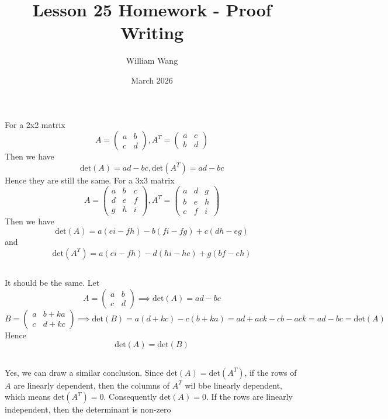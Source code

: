 \documentclass{article}
\title{Lesson 25 Homework - Proof Writing}
\author{William Wang}
\date{March 2026}
\begin{document}
\maketitle

\section{}
\subsection{}
For a 2x2 matrix
\[A = \begin{pmatrix}
    a&b \\ c&d
\end{pmatrix}, A^T = \begin{pmatrix}
    a&c \\ b&d
\end{pmatrix}\]
Then we have 
\[\text{det}(A) = ad-bc, \text{det}(A^T) = ad-bc\]
Hence they are still the same. 
For a 3x3 matrix
\[A = \begin{pmatrix}
    a&b&c \\ d&e&f \\ g&h&i
\end{pmatrix}, A^T = \begin{pmatrix}
    a&d&g \\ b&e&h \\ c&f&i
\end{pmatrix}\]
Then we have 
\[
\text{det}(A) = a(ei-fh) - b(fi-fg) + c(dh-eg)\]
and 
\[\text{det}(A^T) = a(ei-fh)-d(hi-hc)+g(bf-eh)\]
\subsection{}
It should be the same. Let 
\[A = \begin{pmatrix}
    a&b \\ c&d
\end{pmatrix} \implies \text{det}(A) = ad-bc \]
\[B = \begin{pmatrix}
    a&b+ka \\ c&d+kc
\end{pmatrix} \implies \text{det}(B) = a(d+kc) - c(b+ka) = ad+ack - cb-ack = ad-bc = \text{det}(A)\]
Hence 
\[\text{det}(A) = \text{det}(B)\]
\subsection{}
Yes, we can draw a similar conclusion. Since \(\text{det}(A) = \text{det}(A^T)\), if the rows of \(A\) are linearly dependent, then the columns of \(A^T\) wil bbe linearly dependent, which means \(\text{det}(A^T) = 0\). Consequently \(\text{det}(A) = 0\). If the rows are linearly independent, then the determinant is non-zero
 
\end{document}
